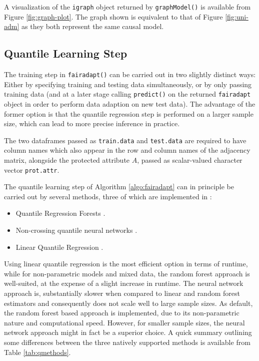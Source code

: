\documentclass[
  nojss]{jss}
\providecommand{\tightlist}{%
  \setlength{\itemsep}{0pt}\setlength{\parskip}{0pt}}
\begin{document}
A visualization of the \texttt{igraph} object returned by
\texttt{graphModel()} is available from Figure \ref{fig:graph-plot}. The
graph shown is equivalent to that of Figure \ref{fig:uni-adm} as they
both represent the same causal model.

\hypertarget{quantile-learning-step}{%
\subsection{Quantile Learning Step}\label{quantile-learning-step}}

The training step in \texttt{fairadapt()} can be carried out in two
slightly distinct ways: Either by specifying training and testing data
simultaneously, or by only passing training data (and at a later stage
calling \texttt{predict()} on the returned \texttt{fairadapt} object in
order to perform data adaption on new test data). The advantage of the
former option is that the quantile regression step is performed on a
larger sample size, which can lead to more precise inference in
practice.

The two dataframes passed as \texttt{train.data} and \texttt{test.data}
are required to have column names which also appear in the row and
column names of the adjacency matrix, alongside the protected attribute
\(A\), passed as scalar-valued character vector \texttt{prot.attr}.

The quantile learning step of Algorithm \ref{algo:fairadapt} can in
principle be carried out by several methods, three of which are
implemented in :

\begin{itemize}
\tightlist
\item
  Quantile Regression Forests \citep{meinshausen2006qrf}.
\item
  Non-crossing quantile neural networks \citep{cannon2018non}.
\item
  Linear Quantile Regression \citep{koenker2001qr}.
\end{itemize}

Using linear quantile regression is the most efficient option in terms
of runtime, while for non-parametric models and mixed data, the random
forest approach is well-suited, at the expense of a slight increase in
runtime. The neural network approach is, substantially slower when
compared to linear and random forest estimators and consequently does
not scale well to large sample sizes. As default, the random forest
based approach is implemented, due to its non-parametric nature and
computational speed. However, for smaller sample sizes, the neural
network approach might in fact be a superior choice. A quick summary
outlining some differences between the three natively supported methods
is available from Table \ref{tab:qmethods}.
\end{document}
